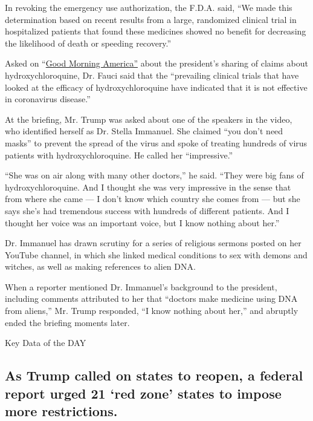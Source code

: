 In revoking the emergency use authorization, the F.D.A. said, ``We made
this determination based on recent results from a large, randomized
clinical trial in hospitalized patients that found these medicines
showed no benefit for decreasing the likelihood of death or speeding
recovery.''

Asked on
``\href{https://www.goodmorningamerica.com/news/story/faucis-concerned-midwest-reopening-afford-surge-72026199}{Good
Morning America''} about the president's sharing of claims about
hydroxychloroquine, Dr. Fauci said that the ``prevailing clinical trials
that have looked at the efficacy of hydroxychloroquine have indicated
that it is not effective in coronavirus disease.''

At the briefing, Mr. Trump was asked about one of the speakers in the
video, who identified herself as Dr. Stella Immanuel. She claimed ``you
don't need masks'' to prevent the spread of the virus and spoke of
treating hundreds of virus patients with hydroxychloroquine. He called
her ``impressive.''

``She was on air along with many other doctors,'' he said. ``They were
big fans of hydroxychloroquine. And I thought she was very impressive in
the sense that from where she came --- I don't know which country she
comes from --- but she says she's had tremendous success with hundreds
of different patients. And I thought her voice was an important voice,
but I know nothing about her.''

Dr. Immanuel has drawn scrutiny for a series of religious sermons posted
on her YouTube channel, in which she linked medical conditions to sex
with demons and witches, as well as making references to alien DNA.

When a reporter mentioned Dr. Immanuel's background to the president,
including comments attributed to her that ``doctors make medicine using
DNA from aliens,'' Mr. Trump responded, ``I know nothing about her,''
and abruptly ended the briefing moments later.

Key Data of the DAY

\hypertarget{as-trump-called-on-states-to-reopen-a-federal-report-urged-21-red-zone-states-to-impose-more-restrictions}{%
\subsection{As Trump called on states to reopen, a federal report urged
21 `red zone' states to impose more
restrictions.}\label{as-trump-called-on-states-to-reopen-a-federal-report-urged-21-red-zone-states-to-impose-more-restrictions}}

